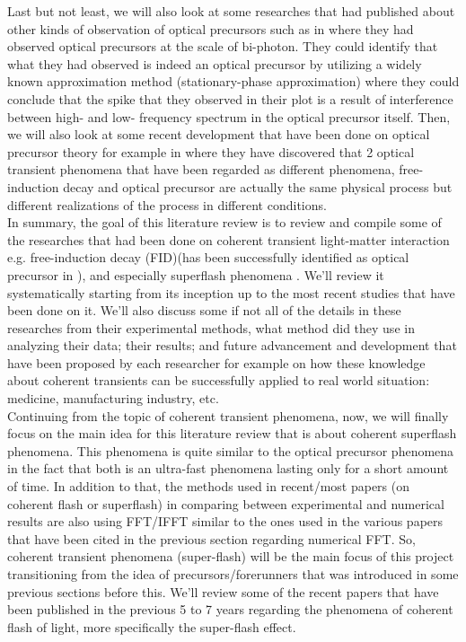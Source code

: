 Last but not least, we will also look at some researches that had published about other kinds of observation of optical precursors such as in \cite{Du2008} where they had observed optical precursors at the scale of bi-photon. They could identify that what they had observed is indeed an optical precursor by utilizing a widely known approximation method (stationary-phase approximation) where they could conclude that the spike that they observed in their plot is a result of interference between high- and low- frequency spectrum in the optical precursor itself. Then, we will also look at some recent development that have been done on optical precursor theory for example in \cite{Chen2010} where they have discovered that 2 optical transient phenomena that have been regarded as different phenomena, free-induction decay and optical precursor are actually the same physical process  but different realizations of the process in different conditions.\\

In summary, the goal of this literature review is to review and compile some of the researches that had been done on coherent transient light-matter interaction e.g. free-induction decay (FID)(has been successfully identified as optical precursor in \cite{Chen2010}), and especially superflash phenomena \cite{Kwong2014}. We'll review it systematically starting from its inception up to the most recent studies that have been done on it. We'll also discuss some if not all of the details in these researches from their experimental methods, what method did they use in analyzing their data; their results; and future advancement and development that have been proposed by each researcher for example on how these knowledge about coherent transients can be successfully applied to real world situation: medicine, manufacturing industry, etc.\\

Continuing from the topic of coherent transient phenomena, now, we will finally focus on the main idea for this literature review that is about coherent superflash phenomena. This phenomena is quite similar to the optical precursor phenomena in the fact that both is an ultra-fast phenomena lasting only for a short amount of time. In addition to that, the methods used in recent/most papers (on coherent flash or superflash) in comparing between experimental and numerical results are also using FFT/IFFT similar to the ones used in the various papers that have been cited in the previous section regarding numerical FFT. So, coherent transient phenomena (super-flash) will be the main focus of this project transitioning from the idea of precursors/forerunners that was introduced in some previous sections before this. We'll review some of the recent papers that have been published in the previous 5 to 7 years regarding the phenomena of coherent flash of light, more specifically the super-flash effect.\\

